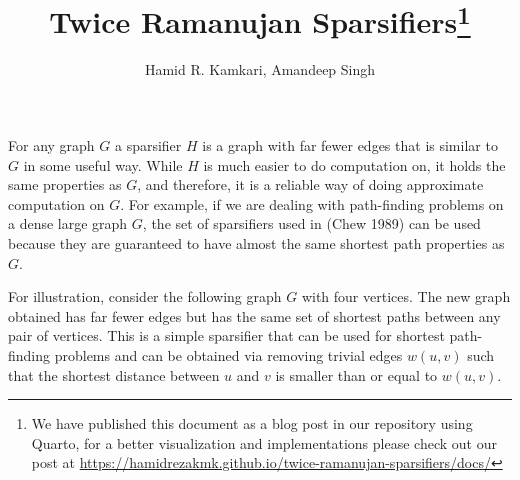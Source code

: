 \documentclass[
  letterpaper,
  DIV=11,
  numbers=noendperiod]{scrartcl}
\title{Twice Ramanujan Sparsifiers\thanks{We have published this
document as a blog post in our repository using Quarto, for a better
visualization and implementations please check out our post at
\url{https://hamidrezakmk.github.io/twice-ramanujan-sparsifiers/docs/}}}
\author{Hamid R. Kamkari, Amandeep Singh}
\date{}
\theoremstyle{plain}
\theoremstyle{plain}
\theoremstyle{plain}
\theoremstyle{definition}
\theoremstyle{plain}
\theoremstyle{remark}
\begin{document}
\maketitle
\ifdefined\Shaded\renewenvironment{Shaded}{\begin{tcolorbox}[borderline west={3pt}{0pt}{shadecolor}, enhanced, boxrule=0pt, sharp corners, breakable, frame hidden, interior hidden]}{\end{tcolorbox}}\fi

For any graph \(G\) a sparsifier \(H\) is a graph with far fewer edges
that is similar to \(G\) in some useful way. While \(H\) is much easier
to do computation on, it holds the same properties as \(G\), and
therefore, it is a reliable way of doing approximate computation on
\(G\). For example, if we are dealing with path-finding problems on a
dense large graph \(G\), the set of sparsifiers used in (Chew 1989) can
be used because they are guaranteed to have almost the same shortest
path properties as \(G\).

For illustration, consider the following graph \(G\) with four vertices.
The new graph obtained has far fewer edges but has the same set of
shortest paths between any pair of vertices. This is a simple sparsifier
that can be used for shortest path-finding problems and can be obtained
via removing trivial edges \(w(u,v)\) such that the shortest distance
between \(u\) and \(v\) is smaller than or equal to \(w(u,v)\).
\end{document}
